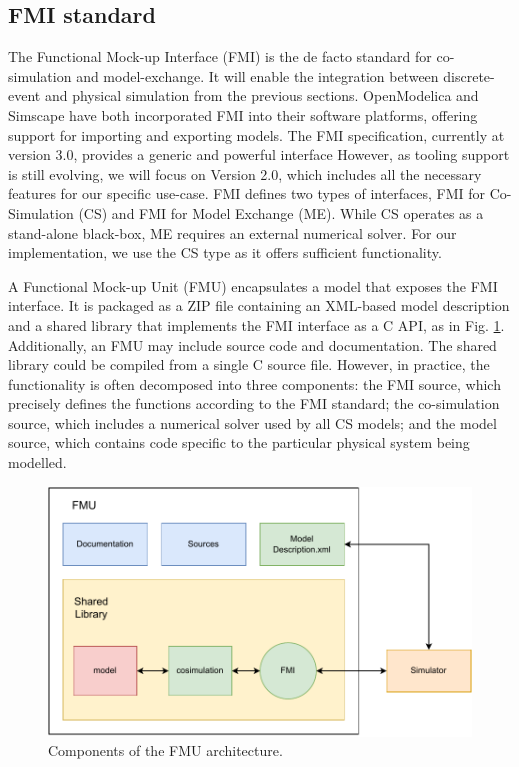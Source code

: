 \documentclass[conference]{IEEEtran}
\begin{document}
\subsection{FMI standard}

The Functional Mock-up Interface (FMI) is the de facto standard for co-simulation and model-exchange.
It will enable the integration between discrete-event and physical simulation from the previous sections.
OpenModelica and Simscape have both incorporated FMI into their software platforms, offering support for importing and exporting models.
The FMI specification, currently at version 3.0, provides a generic and powerful interface
However, as tooling support is still evolving, we will focus on Version 2.0, which includes all the necessary features for our specific use-case.
FMI defines two types of interfaces, FMI for Co-Simulation (CS) and FMI for Model Exchange (ME).
While CS operates as a stand-alone black-box, ME requires an external numerical solver.
For our implementation, we use the CS type as it offers sufficient functionality.

A Functional Mock-up Unit (FMU) encapsulates a model that exposes the FMI interface.
It is packaged as a ZIP file containing an XML-based model description and a shared library that implements the FMI interface as a C API, as in Fig. \ref{FMU-architecture}.
Additionally, an FMU may include source code and documentation.
The shared library could be compiled from a single C source file.
However, in practice, the functionality is often decomposed into three components: the FMI source, which precisely defines the functions according to the FMI standard; the co-simulation source, which includes a numerical solver used by all CS models; and the model source, which contains code specific to the particular physical system being modelled.

\begin{figure}[htbp]
  \centering
  \includegraphics[width=\linewidth]{images/FMU-architecture.drawio.pdf}
  \caption{Components of the FMU architecture.}
  \label{FMU-architecture}
\end{figure}
\end{document}
